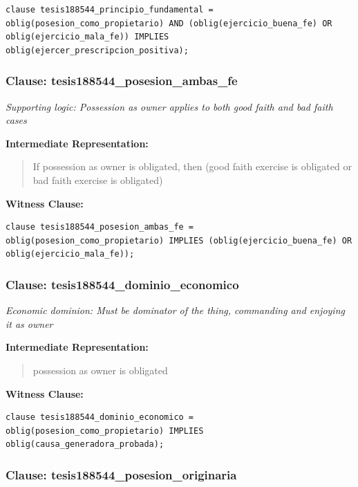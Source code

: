 \documentclass[11pt,a4paper]{article}
\begin{document}
\begin{lstlisting}[style=witnessstyle, language=Witness]
clause tesis188544_principio_fundamental = oblig(posesion_como_propietario) AND (oblig(ejercicio_buena_fe) OR oblig(ejercicio_mala_fe)) IMPLIES oblig(ejercer_prescripcion_positiva);
\end{lstlisting}

\subsubsection{Clause: tesis188544\_posesion\_ambas\_fe}

\textit{Supporting logic: Possession as owner applies to both good faith and bad faith cases}

\textbf{Intermediate Representation:}

\begin{quote}
If possession as owner is obligated, then (good faith exercise is obligated or bad faith exercise is obligated)
\end{quote}

\textbf{Witness Clause:}

\begin{lstlisting}[style=witnessstyle, language=Witness]
clause tesis188544_posesion_ambas_fe = oblig(posesion_como_propietario) IMPLIES (oblig(ejercicio_buena_fe) OR oblig(ejercicio_mala_fe));
\end{lstlisting}

\subsubsection{Clause: tesis188544\_dominio\_economico}

\textit{Economic dominion: Must be dominator of the thing, commanding and enjoying it as owner}

\textbf{Intermediate Representation:}

\begin{quote}
possession as owner is obligated
\end{quote}

\textbf{Witness Clause:}

\begin{lstlisting}[style=witnessstyle, language=Witness]
clause tesis188544_dominio_economico = oblig(posesion_como_propietario) IMPLIES oblig(causa_generadora_probada);
\end{lstlisting}

\subsubsection{Clause: tesis188544\_posesion\_originaria}
\end{document}

